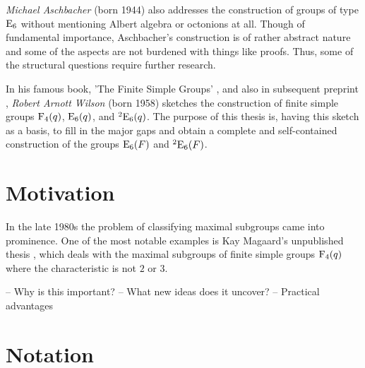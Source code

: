 \textit{Michael Aschbacher} (born 1944) also addresses the 
construction of groups of type $\mathrm{E}_6$ without mentioning Albert
algebra or octonions at all. Though of fundamental importance,
Aschbacher's construction is of rather abstract nature and some
of the aspects are not burdened with things like proofs. Thus,
some of the structural questions require further research. 

In his famous book, 'The Finite Simple Groups' \cite{WilsonBook},
and also in subsequent preprint \cite{WilsonPaper},
\textit{Robert Arnott Wilson} (born 1958) sketches the
construction of finite simple groups $\mathrm{F}_4(q)$, 
$\mathrm{E}_6(q)$, and ${}^2\mathrm{E}_6(q)$. The purpose of this thesis is,
having this sketch as a basis, to fill in the major gaps and 
obtain a complete and self-contained construction of the groups 
$\mathrm{E}_6(F)$ and ${}^2\mathrm{E}_6(F)$.

\section{{Motivation}}

In the late 1980s the problem of classifying maximal subgroups 
came into prominence. One of the most notable examples is
Kay Magaard's unpublished thesis \cite{Magaard}, which deals
with the maximal subgroups of finite simple groups $\mathrm{F}_4(q)$
where the characteristic is not $2$ or $3$. 

-- Why is this important? 
-- What new ideas does it uncover?
-- Practical advantages

\section{{Notation}}



